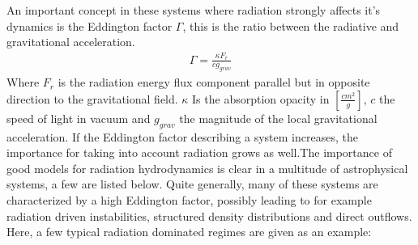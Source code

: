 An important concept in these systems where radiation strongly affects it's dynamics is the Eddington factor $\Gamma$, this is the ratio between the radiative and gravitational acceleration.
\begin{align}
	\Gamma = \frac{\kappa F_r}{c g_{grav}}
\end{align}
Where $F_r$ is the radiation energy flux component parallel but in opposite direction to the gravitational field. $\kappa$ Is the absorption opacity in $[\frac{cm^2}{g}]$, $c$ the speed of light in vacuum and $g_{grav}$ the magnitude of the local gravitational acceleration. If the Eddington factor describing a system increases, the importance for taking into account radiation grows as well.The importance of good models for radiation hydrodynamics is clear in a multitude of astrophysical systems, a few are listed below. Quite generally, many of these systems are characterized by a high Eddington factor, possibly leading to for example radiation driven instabilities, structured density distributions and direct outflows. Here, a few typical radiation dominated regimes are given as an example:

